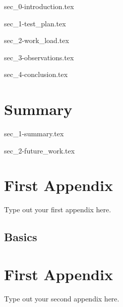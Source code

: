 \documentclass[a4paper,oneside,12pt]{report}
\newcommand{\db}[1]{\textcolor{blue!40}{#1}}
\begin{document}
{sec_0-introduction.tex}
\label{se:results_intro}

{sec_1-test_plan.tex}
\label{se:test_plan}

{sec_2-work_load.tex}
\label{se:work_load}

{sec_3-observations.tex}
\label{se:observations}

{sec_4-conclusion.tex}
\label{se:conclusion}

\chapter{\db{Summary}}
\label{ch:conc}

{sec_1-summary.tex}



{sec_2-future_work.tex}

\appendix
\chapter{First Appendix}
Type out your first appendix here.
\section{Basics}

\chapter{First Appendix}
Type out your second appendix here.

\graphicspath{ {./images/} }



\end{document}

